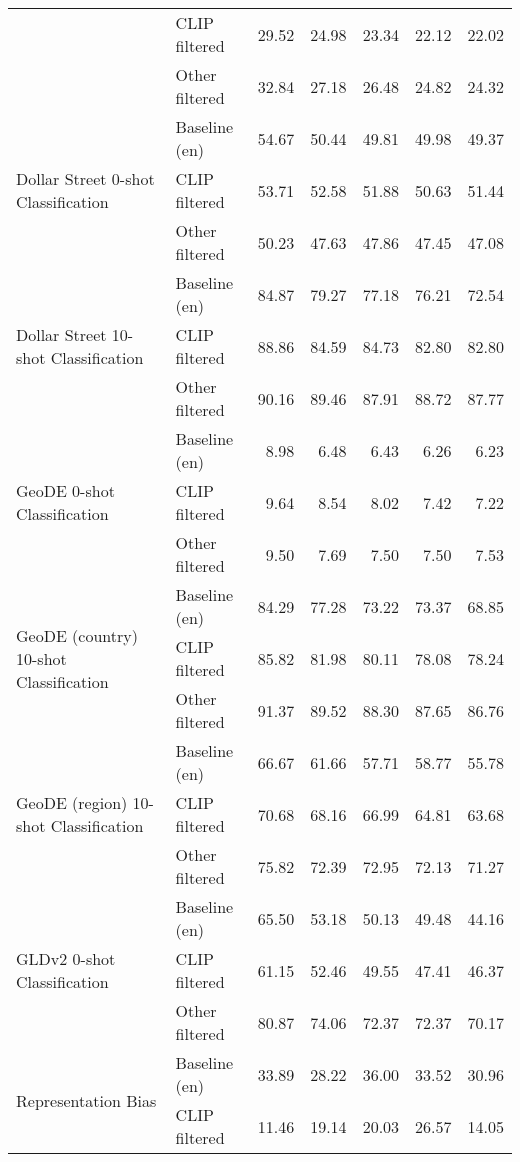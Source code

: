 {\begin{longtable}{l|l|rrrrr}
 & CLIP filtered & 29.52 & 24.98 & 23.34 & 22.12 & 22.02 \\
 & Other filtered & 32.84 & 27.18 & 26.48 & 24.82 & 24.32 \\
\midrule
\multirow[t]{3}{*}{Dollar Street 0-shot Classification} & Baseline (en) & 54.67 & 50.44 & 49.81 & 49.98 & 49.37 \\
 & CLIP filtered & 53.71 & 52.58 & 51.88 & 50.63 & 51.44 \\
 & Other filtered & 50.23 & 47.63 & 47.86 & 47.45 & 47.08 \\
\midrule
\multirow[t]{3}{*}{Dollar Street 10-shot Classification} & Baseline (en) & 84.87 & 79.27 & 77.18 & 76.21 & 72.54 \\
 & CLIP filtered & 88.86 & 84.59 & 84.73 & 82.80 & 82.80 \\
 & Other filtered & 90.16 & 89.46 & 87.91 & 88.72 & 87.77 \\
\midrule
\multirow[t]{3}{*}{GeoDE 0-shot Classification} & Baseline (en) & 8.98 & 6.48 & 6.43 & 6.26 & 6.23 \\
 & CLIP filtered & 9.64 & 8.54 & 8.02 & 7.42 & 7.22 \\
 & Other filtered & 9.50 & 7.69 & 7.50 & 7.50 & 7.53 \\
\midrule
\multirow[t]{3}{*}{GeoDE (country) 10-shot Classification} & Baseline (en) & 84.29 & 77.28 & 73.22 & 73.37 & 68.85 \\
 & CLIP filtered & 85.82 & 81.98 & 80.11 & 78.08 & 78.24 \\
 & Other filtered & 91.37 & 89.52 & 88.30 & 87.65 & 86.76 \\
\midrule
\multirow[t]{3}{*}{GeoDE (region) 10-shot Classification} & Baseline (en) & 66.67 & 61.66 & 57.71 & 58.77 & 55.78 \\
 & CLIP filtered & 70.68 & 68.16 & 66.99 & 64.81 & 63.68 \\
 & Other filtered & 75.82 & 72.39 & 72.95 & 72.13 & 71.27 \\
\midrule
\multirow[t]{3}{*}{GLDv2 0-shot Classification} & Baseline (en) & 65.50 & 53.18 & 50.13 & 49.48 & 44.16 \\
 & CLIP filtered & 61.15 & 52.46 & 49.55 & 47.41 & 46.37 \\
 & Other filtered & 80.87 & 74.06 & 72.37 & 72.37 & 70.17 \\
\midrule
\multirow[t]{3}{*}{Representation Bias} & Baseline (en) & 33.89 & 28.22 & 36.00 & 33.52 & 30.96 \\
 & CLIP filtered & 11.46 & 19.14 & 20.03 & 26.57 & 14.05 \\

\end{longtable}}
